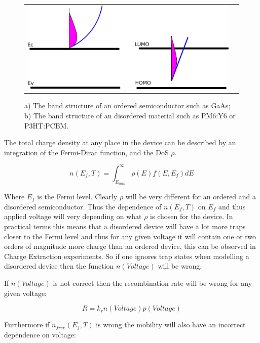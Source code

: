 \begin{figure}[H]
\centering
\begin{tabular}{ c c }

\includegraphics[width=1\textwidth,height=0.4\textwidth]{./images/electrical/band_structure.png}
\\
\end{tabular}
\caption{a) The band structure of an ordered semiconductor such as GaAs; b) The band structure of an disordered material such as PM6:Y6 or P3HT:PCBM.}
\label{fig:dos_image}
\end{figure}

The total charge density at any place in the device can be described by an integration of the Fermi-Dirac function, and the DoS $\rho$.

\begin{equation}
n(E_{f},T)=\int^{\infty}_{E_{min}} \rho(E) f(E,E_{f}) dE
\end{equation}

Where $E_{f}$ is the Fermi level. Clearly $\rho$ will be very different for an ordered and a disordered semiconductor. Thus the dependence of $n(E_{f},T)$ on $E_{f}$ and thus applied voltage will very depending on what $\rho$ is chosen for the device. In practical terms this means that a disordered device will have a lot more traps closer to the Fermi level and thus for any given voltage it will contain one or two orders of magnitude more charge than an ordered device, this can be observed in Charge Extraction experiments. So if one ignores trap states when modelling a disordered device then the function $n(Voltage)$ will be wrong.

If $n(Voltage)$ is not correct then the recombination rate will be wrong for any given voltage:

\begin{equation}
R=k_{r}n(Voltage) p(Voltage)
\end{equation}


Furthermore if $n_{free}(E_{f},T)$ is wrong the mobility will also have an incorrect dependence on voltage:

